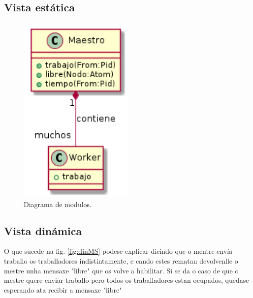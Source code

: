 \documentclass[DIV=calc,paper=a4,fontsize=11pt,onecolumn]{scrartcl}	 %
\begin{document}
\subsection{Vista estática}
\begin{figure}[h]
\centering
\includegraphics[width = 0.5\textwidth]{./figuras/estaticoMS.png}
\caption{Diagrama de modulos.}
\label{fig:estMS}
\end{figure}

\newpage
\subsection{Vista dinámica}
O que sucede na fig. \ref{fig:dinMS} podese explicar dicindo que o mentre envía traballo os traballadores indistintamente, e cando estes rematan devolvenlle o mestre unha mensaxe "libre" que os volve a habilitar.
Si se da o caso de que o mestre quere enviar traballo pero todos os traballadores estan ocupados, quedase esperando ata recibir a mensaxe "libre"
\end{document}
